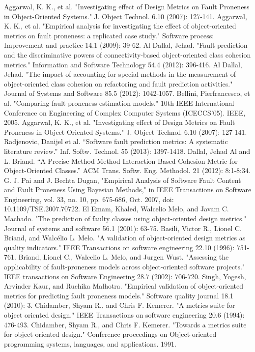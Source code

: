 \begin{thebibliography}{00}
	 Aggarwal, K. K., et al. "Investigating effect of Design Metrics on Fault Proneness in Object-Oriented Systems." J. Object Technol. 6.10 (2007): 127-141.
	 Aggarwal, K. K., et al. "Empirical analysis for investigating the effect of object‐oriented metrics on fault proneness: a replicated case study." Software process: Improvement and practice 14.1 (2009): 39-62.
	 Al Dallal, Jehad. "Fault prediction and the discriminative powers of connectivity-based object-oriented class cohesion metrics." Information and Software Technology 54.4 (2012): 396-416.
	 Al Dallal, Jehad. "The impact of accounting for special methods in the measurement of object-oriented class cohesion on refactoring and fault prediction activities." Journal of Systems and Software 85.5 (2012): 1042-1057.
	 Bellini, Pierfrancesco, et al. "Comparing fault-proneness estimation models." 10th IEEE International Conference on Engineering of Complex Computer Systems (ICECCS'05). IEEE, 2005.
	 Aggarwal, K. K., et al. "Investigating effect of Design Metrics on Fault Proneness in Object-Oriented Systems." J. Object Technol. 6.10 (2007): 127-141.
	 Radjenovic, Danijel et al. “Software fault prediction metrics: A systematic literature review.” Inf. Softw. Technol. 55 (2013): 1397-1418.
	Dallal, Jehad Al and L. Briand. “A Precise Method-Method Interaction-Based Cohesion Metric for Object-Oriented Classes.” ACM Trans. Softw. Eng. Methodol. 21 (2012): 8:1-8:34.
	 G. J. Pai and J. Bechta Dugan, "Empirical Analysis of Software Fault Content and Fault Proneness Using Bayesian Methods," in IEEE Transactions on Software Engineering, vol. 33, no. 10, pp. 675-686, Oct. 2007, doi: 10.1109/TSE.2007.70722.
	 El Emam, Khaled, Walcelio Melo, and Javam C. Machado. "The prediction of faulty classes using object-oriented design metrics." Journal of systems and software 56.1 (2001): 63-75.
	 Basili, Victor R., Lionel C. Briand, and Walcélio L. Melo. "A validation of object-oriented design metrics as quality indicators." IEEE Transactions on software engineering 22.10 (1996): 751-761.
	 Briand, Lionel C., Walcelio L. Melo, and Jurgen Wust. "Assessing the applicability of fault-proneness models across object-oriented software projects." IEEE transactions on Software Engineering 28.7 (2002): 706-720.
	 Singh, Yogesh, Arvinder Kaur, and Ruchika Malhotra. "Empirical validation of object-oriented metrics for predicting fault proneness models." Software quality journal 18.1 (2010): 3.
	 Chidamber, Shyam R., and Chris F. Kemerer. "A metrics suite for object oriented design." IEEE Transactions on software engineering 20.6 (1994): 476-493.
	 Chidamber, Shyam R., and Chris F. Kemerer. "Towards a metrics suite for object oriented design." Conference proceedings on Object-oriented programming systems, languages, and applications. 1991.
\end{thebibliography}